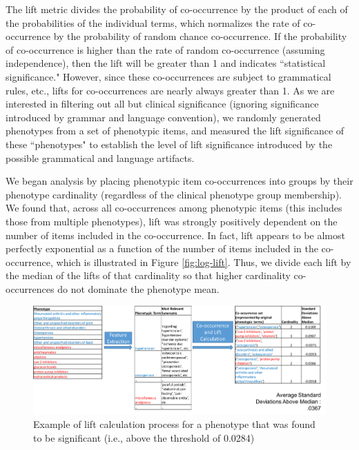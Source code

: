 \documentclass{sig-alternate-05-2015}
\begin{document}
The lift metric divides the probability of co-occurrence by the product of each of the probabilities of the individual terms, which normalizes the rate of co-occurrence by the probability of random chance co-occurrence.
If the probability of co-occurrence is higher than the rate of random co-occurrence (assuming independence), then the lift will be greater than 1 and indicates ``statistical significance."
However, since these co-occurrences are subject to grammatical rules, etc., lifts for co-occurrences are nearly always greater than 1.
As we are interested in filtering out all but clinical significance (ignoring significance introduced by grammar and language convention), we randomly generated phenotypes from a set of phenotypic items, and measured the lift significance of these ``phenotypes" to establish the level of lift significance introduced by the possible grammatical and language artifacts.

We began analysis by placing phenotypic item co-occurrences into groups by their phenotype cardinality (regardless of the clinical phenotype group membership). 
We found that, across all co-occurrences among phenotypic items (this includes those from multiple phenotypes), lift was strongly positively dependent on the number of items included in the co-occurrence.
In fact, lift appears to be almost perfectly exponential as a function of the number of items included in the co-occurrence, which is illustrated in Figure \ref{fig:log-lift}. 
Thus, we divide each lift by the median of the lifts of that cardinality so that higher cardinality co-occurrences do not dominate the phenotype mean. 

\begin{figure} [t]
\centering
\includegraphics[width=\linewidth]{lift-process-cartoon.png}
\caption{Example of lift calculation process for a phenotype that was found to be significant (i.e., above the threshold of 0.0284)}
\label{fig:lift-process-cartoon}
\end{figure}


\end{document}
